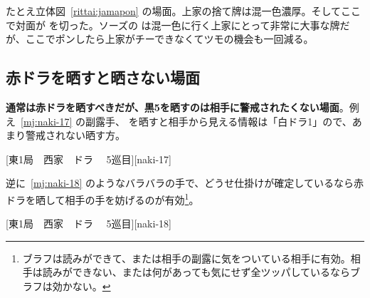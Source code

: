 \documentclass[../nankiru_main.tex]{subfiles}
\begin{document}
たとえ立体図~\ref{rittai:jamapon} の場面。上家の捨て牌は混一色濃厚。そしてここで対面が  を切った。ソーズの  は混一色に行く上家にとって非常に大事な牌だが、ここでポンしたら上家がチーできなくてツモの機会も一回減る。


\subsection{赤ドラを晒すと晒さない場面}

\textbf{通常は赤ドラを晒すべきだが、黒5を晒すのは相手に警戒されたくない場面}\citep[][p.~194]{hirasawa-naki}。例え~\ref{mj:naki-17} の副露手、 を晒すと相手から見える情報は「白ドラ1」ので、あまり警戒されない晒す方。

[東1局　西家　ドラ 　5巡目][naki-17]

逆に~\ref{mj:naki-18} のようなバラバラの手で、どうせ仕掛けが確定しているなら赤ドラを晒して相手の手を妨げるのが有効\footnote{ブラフは読みができて、または相手の副露に気をついている相手に有効。相手は読みができない、または何があっても気にせず全ツッパしているならブラフは効かない。}\citep[][pp.~196--197]{hirasawa-naki}。

[東1局　西家　ドラ 　5巡目][naki-18]
\end{document}
